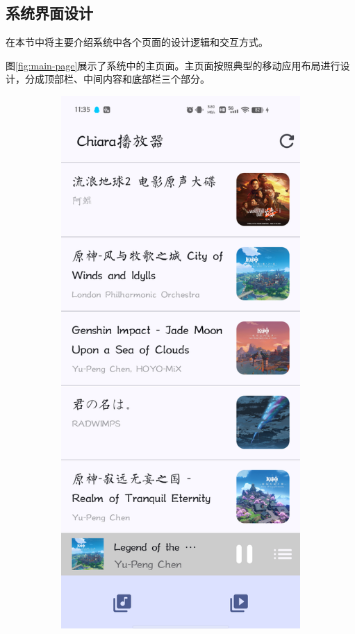 \documentclass[main.tex]{subfiles}
\begin{document}
\subsection{系统界面设计}

在本节中将主要介绍系统中各个页面的设计逻辑和交互方式。

图\ref{fig:main-page}展示了系统中的主页面。主页面按照典型的移动应用布局进行设计，分成顶部栏、中间内容和底部栏三个部分。

\begin{figure}[htbp]
    \centering
    \begin{subfigure}{0.45\linewidth}
        \centering
        \includegraphics[width=0.9\linewidth]{assets/main-music-page.png}

\end{subfigure}
\end{figure}
\end{document}

